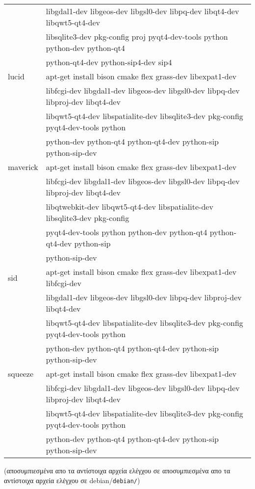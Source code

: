 \begin{center}
\begin{tabular}{|l|l|}
& libgdal1-dev libgeos-dev libgsl0-dev libpq-dev libqt4-dev libqwt5-qt4-dev \\
& libsqlite3-dev pkg-config proj pyqt4-dev-tools python python-dev python-qt4 \\
& python-qt4-dev python-sip4-dev sip4 \\
\hline lucid & apt-get install  bison cmake flex grass-dev libexpat1-dev \\
& libfcgi-dev libgdal1-dev libgeos-dev libgsl0-dev libpq-dev libproj-dev libqt4-dev \\
& libqwt5-qt4-dev libspatialite-dev libsqlite3-dev pkg-config pyqt4-dev-tools python \\
& python-dev python-qt4 python-qt4-dev python-sip python-sip-dev \\
\hline maverick & apt-get install  bison cmake flex grass-dev libexpat1-dev \\
& libfcgi-dev libgdal1-dev libgeos-dev libgsl0-dev libpq-dev libproj-dev libqt4-dev \\
& libqtwebkit-dev libqwt5-qt4-dev libspatialite-dev libsqlite3-dev pkg-config \\
& pyqt4-dev-tools python python-dev python-qt4 python-qt4-dev python-sip \\
& python-sip-dev \\
\hline sid & apt-get install  bison cmake flex grass-dev libexpat1-dev libfcgi-dev \\
& libgdal1-dev libgeos-dev libgsl0-dev libpq-dev libproj-dev libqt4-dev \\
& libqwt5-qt4-dev libspatialite-dev libsqlite3-dev pkg-config pyqt4-dev-tools python \\
& python-dev python-qt4 python-qt4-dev python-sip python-sip-dev \\
\hline squeeze & apt-get install  bison cmake flex grass-dev libexpat1-dev \\
& libfcgi-dev libgdal1-dev libgeos-dev libgsl0-dev libpq-dev libproj-dev libqt4-dev \\
& libqwt5-qt4-dev libspatialite-dev libsqlite3-dev pkg-config pyqt4-dev-tools python \\
& python-dev python-qt4 python-qt4-dev python-sip python-sip-dev \\
\hline \end{tabular}\end{center}

(αποσυμπιεσμένα απο τα αντίστοιχα αρχεία ελέγχου σε αποσυμπιεσμένα απο τα αντίστοιχα αρχεία ελέγχου σε debian/\texttt{debian/})

